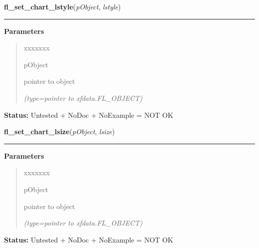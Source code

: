\hspace{.8\funcindent}\begin{boxedminipage}{\funcwidth}

    \raggedright \textbf{fl\_set\_chart\_lstyle}(\textit{pObject}, \textit{lstyle})

    \vspace{-1.5ex}

    \rule{\textwidth}{0.5\fboxrule}
\setlength{\parskip}{2ex}
\setlength{\parskip}{1ex}
      \textbf{Parameters}
      \vspace{-1ex}

      \begin{quote}
        \begin{Ventry}{xxxxxxx}

          \item[pObject]

          pointer to object

            {\it (type=pointer to xfdata.FL\_OBJECT)}

        \end{Ventry}

      \end{quote}

\textbf{Status:} Untested + NoDoc + NoExample = NOT OK



    \end{boxedminipage}

    \label{xformslib:library:fl_set_chart_lsize}

    \vspace{0.5ex}

\hspace{.8\funcindent}\begin{boxedminipage}{\funcwidth}

    \raggedright \textbf{fl\_set\_chart\_lsize}(\textit{pObject}, \textit{lsize})

    \vspace{-1.5ex}

    \rule{\textwidth}{0.5\fboxrule}
\setlength{\parskip}{2ex}
\setlength{\parskip}{1ex}
      \textbf{Parameters}
      \vspace{-1ex}

      \begin{quote}
        \begin{Ventry}{xxxxxxx}

          \item[pObject]

          pointer to object

            {\it (type=pointer to xfdata.FL\_OBJECT)}

        \end{Ventry}

      \end{quote}

\textbf{Status:} Untested + NoDoc + NoExample = NOT OK



    \end{boxedminipage}

